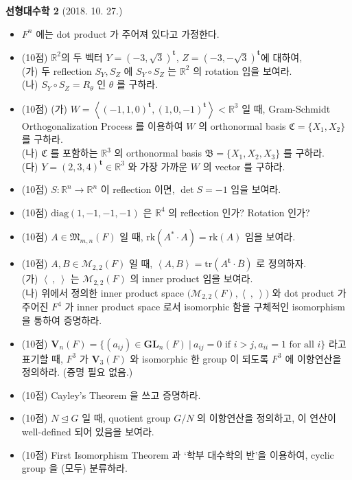 \documentclass[12pt]{report}
\newcommand{\numl}[1]{\item[\textbf{#1}]}
\newcommand{\mf}[1]{\mathfrak{#1}}
\newcommand{\mc}[1]{\mathcal{#1}}
\newcommand{\bb}[1]{\mathbb{#1}}
\newcommand{\rmbf}[1]{\mathrm{\mathbf{#1}}}
\newcommand{\trans}{^{\mathrm{\mathbf{t}}}}
\renewcommand{\span}[1]{\left\langle #1 \right\rangle}
\newcommand{\rk}{\text{rk}}
\newcommand{\tr}{\text{tr}}
\newcommand{\diag}{\text{diag}}
\begin{document}
\begin{center}
\textbf{\large 선형대수학 2} (2018. 10. 27.)
\end{center}

\begin{itemize}
\numl{1--4.} $F^n$ 에는 dot product 가 주어져 있다고 가정한다.
\numl{1.} (10점) $\bb{R}^2$의 두 벡터 $Y=\left(-3, \sqrt{3}\right)\trans$, $Z=(-3, -\sqrt{3})\trans$에 대하여,\\
(가) 두 reflection $S_Y, S_Z$ 에 $S_Y\circ S_Z$ 는 $\bb{R}^2$ 의 rotation 임을 보여라.\\
(나) $S_Y\circ S_Z = R_\theta$ 인 $\theta$ 를 구하라.

\numl{2.} (10점) (가) $W=\span{\left(-1, 1, 0\right)\trans, \left(1,0,-1\right)\trans} < \bb{R}^3$ 일 때, Gram-Schmidt Orthogonalization Process 를 이용하여 $W$ 의 orthonormal basis $\mf{C}=\{X_1, X_2\}$ 를 구하라.\\
(나) $\mf{C}$ 를 포함하는 $\bb{R}^3$ 의 orthonormal basis $\mf{B}=\{X_1, X_2, X_3\}$ 를 구하라. \\
(다) $Y=\left(2, 3, 4\right)\trans\in \bb{R}^3$ 와 가장 가까운 $W$ 의 vector 를 구하라.
 
\numl{3.} (10점) $S:\bb{R}^n\rightarrow\bb{R}^n$ 이 reflection 이면, $\det S = -1$ 임을 보여라.

\numl{4.} (10점) $\diag(1, -1, -1, -1)$ 은 $\bb{R}^4$ 의 reflection 인가? Rotation 인가?

\numl{5.} (10점) $A\in \mf{M}_{m, n}(F)$ 일 때, $\rk(A^\ast \cdot A) = \rk(A)$ 임을 보여라.

\numl{6.} (10점) $A, B\in \mc{M}_{2, 2}(F)$ 일 때, $\span{A, B} = \tr(A\trans\cdot \overline{B})$ 로 정의하자.\\
(가) $\span{ \:,\:}$ 는 $\mc{M}_{2, 2}(F)$ 의 inner product 임을 보여라. \\
(나) 위에서 정의한 inner product space $\big(\mc{M}_{2, 2}(F), \span{\:, \:}\big)$ 와 dot product 가 주어진 $F^4$ 가 inner product space 로서 isomorphic 함을 구체적인 isomorphism 을 통하여 증명하라.

\numl{7.} (10점) $\rmbf{V}_n(F) = \big\{(a_{ij})\in \rmbf{GL}_n(F) \:|\: a_{ij} = 0 \text{ if } i > j, a_{ii} = 1 \text{ for all } i \big\}$ 라고 표기할 때, $F^3$ 가 $\rmbf{V}_3(F)$ 와 isomorphic 한 group 이 되도록 $F^3$ 에 이항연산을 정의하라. (증명 필요 없음.)

\numl{8.} (10점) Cayley's Theorem 을 쓰고 증명하라.

\numl{9.} (10점) $N\unlhd G$ 일 때, quotient group $G/N$ 의 이항연산을 정의하고, 이 연산이 well-defined 되어 있음을 보여라.

\numl{10.} (10점) First Isomorphism Theorem 과 `학부 대수학의 반'을 이용하여, cyclic group 을 (모두) 분류하라.

\end{itemize}
\end{document}
